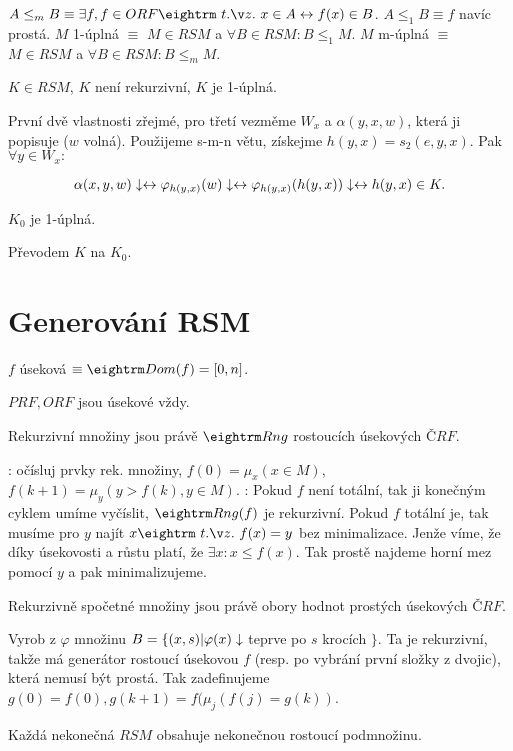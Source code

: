 \itemize{\dfn}
\: $A \le_m B \equiv \exists f, f \in ORF \st x \in A \iff f(x) \in B$.
\: $A \le_1 B \equiv f$ navíc prostá.
\: $M$ 1-úplná $\equiv$ $M \in RSM$ a $\forall B \in RSM: B \le_1 M$.
\: $M$ m-úplná $\equiv$ $M \in RSM$ a $\forall B \in RSM: B \le_m M$.
\endlist

 $K \in RSM$, $K$ není rekurzivní, $K$ je 1-úplná.

\prf{} První dvě vlastnosti zřejmé, pro třetí vezměme $W_x$ a $\alpha(y,x,w)$,
která ji popisuje ($w$ volná). Použijeme s-m-n větu, získejme $h(y,x) = s_2(e,y,x)$. Pak
$\forall y \in W_x:$

$$ \alpha(x,y,w)\downarrow \leftrightarrow \varphi_{h(y,x)}(w)\downarrow \leftrightarrow  \varphi_{h(y,x)}(h(y,x))\downarrow \leftrightarrow h(y,x) \in K.$$

 $K_0$ je 1-úplná.

\prf{} Převodem $K$ na $K_0$.

\section{Generování RSM}

\dfn $f$ úseková $\equiv \dom(f) = [0,n]$.

\obs{} $PRF, ORF$ jsou úsekové vždy.

 Rekurzivní množiny jsou právě $\rng$ rostoucích úsekových $ČRF$. 

\prf{}

\itemize\ibull
\: \uv{$\then$}: očísluj prvky rek. množiny, $f(0) = \mu_x(x \in M)$, $f(k+1) = \mu_y(y > f(k), y \in M)$.
\: \uv{$\leftarrow$}: Pokud $f$ není totální, tak ji konečným cyklem umíme
vyčíslit, $\rng(f)$ je rekurzivní.  Pokud $f$ totální je, tak musíme pro $y$
najít $x \st f(x) = y$ bez minimalizace. Jenže víme, že díky úsekovosti a růstu
platí, že $\exists x: x \le f(x)$. Tak prostě najdeme horní mez pomocí $y$ a
pak minimalizujeme.
\endlist

\thm{} Rekurzivně spočetné množiny jsou právě obory hodnot prostých úsekových $ČRF$.

\prf{} Vyrob z $\varphi$ množinu $B = \{(x,s) | \varphi(x) \downarrow$ teprve po $s$ krocích $\}$.
Ta je rekurzivní, takže má generátor rostoucí úsekovou $f$ (resp. po vybrání první složky z dvojic),
která nemusí být prostá. Tak zadefinujeme $g(0) = f(0), g(k+1) = f(\mu_j(f(j) = g(k))$.

\thm{} Každá nekonečná $RSM$ obsahuje nekonečnou rostoucí podmnožinu.
 
